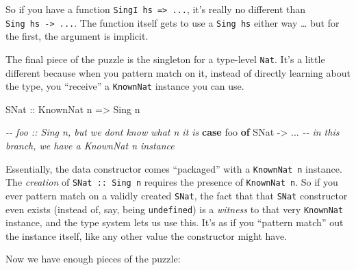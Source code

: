 \documentclass[]{article}
\newenvironment{Shaded}{}{}
\newcommand{\CommentTok}[1]{\textcolor[rgb]{0.38,0.63,0.69}{\textit{#1}}}
\newcommand{\DataTypeTok}[1]{\textcolor[rgb]{0.56,0.13,0.00}{#1}}
\newcommand{\KeywordTok}[1]{\textcolor[rgb]{0.00,0.44,0.13}{\textbf{#1}}}
\newcommand{\NormalTok}[1]{#1}
\newcommand{\OperatorTok}[1]{\textcolor[rgb]{0.40,0.40,0.40}{#1}}
\newcommand{\OtherTok}[1]{\textcolor[rgb]{0.00,0.44,0.13}{#1}}
\begin{document}
So if you have a function \texttt{SingI\ hs\ =\textgreater{}\ ...}, it's really
no different than \texttt{Sing\ hs\ -\textgreater{}\ ...}. The function itself
gets to use a \texttt{Sing\ hs} either way \ldots{} but for the first, the
argument is implicit.

The final piece of the puzzle is the singleton for a type-level \texttt{Nat}.
It's a little different because when you pattern match on it, instead of
directly learning about the type, you ``receive'' a \texttt{KnownNat} instance
you can use.

\begin{Shaded}
\begin{Highlighting}[]
\DataTypeTok{SNat}\OtherTok{ ::} \DataTypeTok{KnownNat}\NormalTok{ n }\OtherTok{=>} \DataTypeTok{Sing}\NormalTok{ n}
\end{Highlighting}
\end{Shaded}

\begin{Shaded}
\begin{Highlighting}[]
\CommentTok{{-}{-} \textasciigrave{}foo :: Sing n\textasciigrave{}, but we don\textquotesingle{}t know what \textasciigrave{}n\textasciigrave{} it is}
\KeywordTok{case}\NormalTok{ foo }\KeywordTok{of}
  \DataTypeTok{SNat} \OtherTok{{-}>} \OperatorTok{...}   \CommentTok{{-}{-} in this branch, we have a \textasciigrave{}KnownNat n\textasciigrave{} instance}
\end{Highlighting}
\end{Shaded}

Essentially, the data constructor comes ``packaged'' with a \texttt{KnownNat\ n}
instance. The \emph{creation} of \texttt{SNat\ ::\ Sing\ n} requires the
presence of \texttt{KnownNat\ n}. So if you ever pattern match on a validly
created \texttt{SNat}, the fact that that \texttt{SNat} constructor even exists
(instead of, say, being \texttt{undefined}) is a \emph{witness} to that very
\texttt{KnownNat} instance, and the type system lets us use this. It's as if you
``pattern match'' out the instance itself, like any other value the constructor
might have.

Now we have enough pieces of the puzzle:
\end{document}
